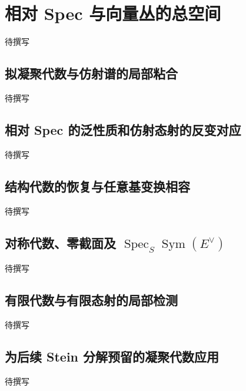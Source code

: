 
% 
% 
% 
% 
% 
% 
% 

\section{相对 Spec 与向量丛的总空间}
\label{g5:sec:1305}

待撰写

\subsection{拟凝聚代数与仿射谱的局部粘合}
\label{g5:subsec:1305:01}
待撰写

\subsection{相对 Spec 的泛性质和仿射态射的反变对应}
\label{g5:subsec:1305:02}
待撰写

\subsection{结构代数的恢复与任意基变换相容}
\label{g5:subsec:1305:03}
待撰写

\subsection{\texorpdfstring{对称代数、零截面及 \(\operatorname{Spec}_S\operatorname{Sym}(E^\vee)\)}{对称代数、零截面及 Spec\_S Sym(E∨)}}
\label{g5:subsec:1305:04}
待撰写

\subsection{有限代数与有限态射的局部检测}
\label{g5:subsec:1305:05}
待撰写

\subsection{为后续 Stein 分解预留的凝聚代数应用}
\label{g5:subsec:1305:06}
待撰写
